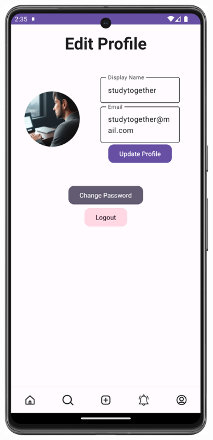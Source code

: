 \begin{figure}[H]
  \begin{subfigure}[b]{0.3\textwidth}
    \includegraphics[width=\textwidth]{Figures/Product_Images/Auth/edit_profile.png}

\end{subfigure}
\end{figure}
